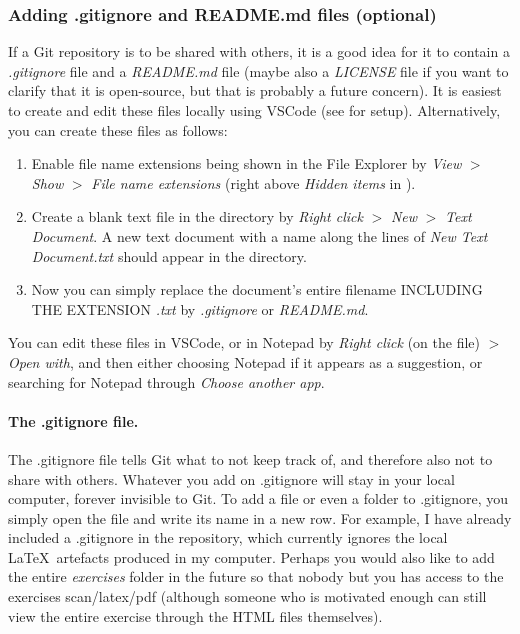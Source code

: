 \documentclass[a4paper,10pt]{article}
\begin{document}
\subsubsection{Adding .gitignore and README.md files (optional)}
\label{sec:gitignore}

If a Git repository is to be shared with others, it is a good idea for it to contain a \emph{.gitignore} file and a \emph{README.md} file (maybe also a \emph{LICENSE} file if you want to clarify that it is open-source, but that is probably a future concern). It is easiest to create and edit these files locally using VSCode (see  for setup). Alternatively, you can create these files as follows:
\begin{enumerate}
    \item Enable file name extensions being shown in the File Explorer by \emph{View} $>$ \emph{Show} $>$ \emph{File name extensions} (right above \emph{Hidden items} in ).
    \item Create a blank text file in the directory by \emph{Right click} $>$ \emph{New} $>$ \emph{Text Document}. A new text document with a name along the lines of \emph{New Text Document.txt} should appear in the directory.
    \item Now you can simply replace the document's entire filename INCLUDING THE EXTENSION \emph{.txt} by \emph{.gitignore} or \emph{README.md}.
\end{enumerate}
You can edit these files in VSCode, or in Notepad by \emph{Right click} (on the file) $>$ \emph{Open with}, and then either choosing Notepad if it appears as a suggestion, or searching for Notepad through \emph{Choose another app}.

\paragraph{The .gitignore file.} The .gitignore file tells Git what to not keep track of, and therefore also not to share with others. Whatever you add on .gitignore will stay in your local computer, forever invisible to Git. To add a file or even a folder to .gitignore, you simply open the file and write its name in a new row. For example, I have already included a .gitignore in the repository, which currently ignores the local \LaTeX\ artefacts produced in my computer. Perhaps you would also like to add the entire \emph{exercises} folder in the future so that nobody but you has access to the exercises scan/latex/pdf (although someone who is motivated enough can still view the entire exercise through the HTML files themselves).
\end{document}
